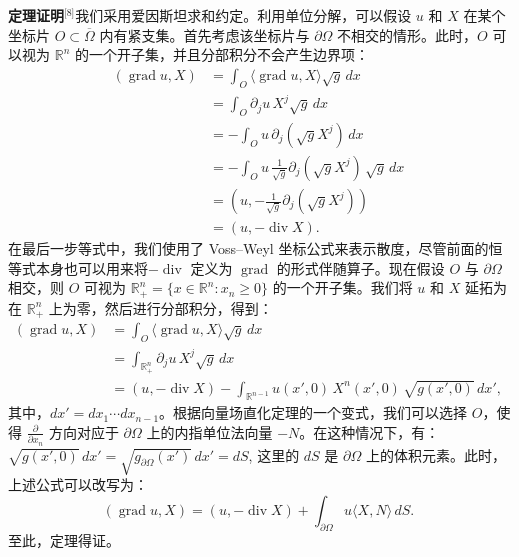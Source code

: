 \textbf{定理证明}\(^\text{[8]}\)我们采用爱因斯坦求和约定。利用单位分解，可以假设 $u$ 和 $X$ 在某个坐标片 $O \subset \overline{\Omega}$ 内有紧支集。首先考虑该坐标片与 $\partial \Omega$ 不相交的情形。此时，$O$ 可以视为 $\mathbb{R}^n$ 的一个开子集，并且分部积分不会产生边界项：
$$
\begin{aligned}
(\operatorname{grad} u, X)
&= \int_{O} \langle \operatorname{grad} u, X \rangle \sqrt{g} \, dx \\[6pt]
&= \int_{O} \partial_j u \, X^j \sqrt{g} \, dx \\[6pt]
&= - \int_{O} u \, \partial_j (\sqrt{g} X^j) \, dx \\[6pt]
&= - \int_{O} u \, \frac{1}{\sqrt{g}} \partial_j (\sqrt{g} X^j) \, \sqrt{g} \, dx \\[6pt]
&= (u, - \frac{1}{\sqrt{g}} \partial_j (\sqrt{g} X^j)) \\[6pt]
&= (u, - \operatorname{div} X).
\end{aligned}~
$$
在最后一步等式中，我们使用了 Voss–Weyl 坐标公式来表示散度，尽管前面的恒等式本身也可以用来将$-\operatorname{div}$ 定义为 $\operatorname{grad}$ 的形式伴随算子。现在假设 $O$ 与 $\partial \Omega$ 相交，则 $O$ 可视为 $\mathbb{R}_+^n = \{x \in \mathbb{R}^n : x_n \ge 0\}$ 的一个开子集。我们将 $u$ 和 $X$ 延拓为在 $\mathbb{R}_+^n$ 上为零，然后进行分部积分，得到：
$$
\begin{aligned}
(\operatorname{grad} u, X)
&= \int_{O} \langle \operatorname{grad} u, X \rangle \sqrt{g} \, dx \\[6pt]
&= \int_{\mathbb{R}_+^n} \partial_j u \, X^j \sqrt{g} \, dx \\[6pt]
&= (u, -\operatorname{div} X) 
  - \int_{\mathbb{R}^{n-1}} u(x', 0) \, X^n(x', 0) \, \sqrt{g(x', 0)} \, dx',
\end{aligned}~
$$
其中，$dx' = dx_1 \cdots dx_{n-1}$。根据向量场直化定理的一个变式，我们可以选择 $O$，使得 $\frac{\partial}{\partial x_n}$ 方向对应于 $\partial \Omega$ 上的内指单位法向量 $-N$。在这种情况下，有：$\sqrt{g(x', 0)} \, dx' = \sqrt{g_{\partial \Omega}(x')} \, dx' = dS$,
这里的 $dS$ 是 $\partial \Omega$ 上的体积元素。此时，上述公式可以改写为：
$$
(\operatorname{grad} u, X)
= (u, -\operatorname{div} X)
  + \int_{\partial \Omega} u \langle X, N \rangle \, dS.~
$$
至此，定理得证。
